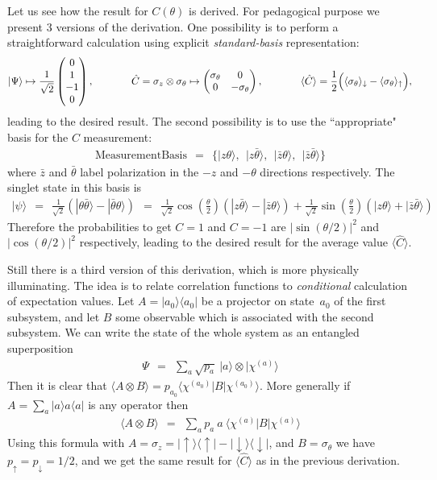 \documentclass[onecolumn,fleqn]{revtex4}
\newcommand{\amatrix}[1]{\begin{matrix} #1 \end{matrix}}
\newcommand{\beq}{\begin{eqnarray}}
\newcommand{\eeq}{\end{eqnarray}}
\begin{document}
Let us see how the result for ${C(\theta)}$ is derived. 
For pedagogical purpose we present 3 versions of the 
derivation. One possibility  is to perform a straightforward 
calculation using explicit {\em standard-basis} representation:        
\beq
|\Psi\rangle  \mapsto \frac{1}{\sqrt{2}}\left(\amatrix{0 \cr 1 \cr -1 \cr 0}\right),
\ \ \ \ \ \ \ \ \ \ \     
\hat{C} = \sigma_z \otimes \sigma_{\theta} 
\mapsto \left(\amatrix{ \sigma_{\theta} & 0 \cr 0 & -\sigma_{\theta} }\right),
\ \ \ \ \ \ \ \ \ \ \  
\langle \hat{C}\rangle = \frac{1}{2}\Big(\langle\sigma_{\theta}\rangle_{\downarrow}-\langle\sigma_{\theta}\rangle_{\uparrow}\Big), 
\eeq
leading to the desired result. The second possibility
is to use the ``appropriate" basis for the $C$ measurement:
\beq
\text{MeasurementBasis} \ \ = \ \ 
\Big\{ 
|z \theta\rangle, \ \ 
|z \bar{\theta}\rangle, \ \ 
|\bar{z} \theta\rangle, \ \ 
|\bar{z} \bar{\theta}\rangle
\Big\} 
\eeq
where $\bar{z}$ and $\bar{\theta}$ label polarization 
in the $-z$ and $-\theta$ directions respectively.
The singlet state in this basis is 
\beq 
|\psi \rangle 
\ \ = \ \ \frac{1}{\sqrt{2}} \left( |\theta\bar{\theta}\rangle-|\bar{\theta}\theta\rangle \right) 
\ \ = \ \ 
\frac{1}{\sqrt{2}}\cos\left(\frac{\theta}{2}\right) \left( |z \bar{\theta}\rangle - |\bar{z}\theta\rangle \right) 
+\frac{1}{\sqrt{2}}\sin\left(\frac{\theta}{2}\right) \left( |z \theta\rangle + |\bar{z}\bar{\theta}\rangle \right)
\eeq
Therefore the probabilities to get $C{=}1$ and $C{=}-1$ 
are $|\sin(\theta/2)|^2$ and $|\cos(\theta/2)|^2$ respectively, 
leading to the desired result for the average value $\langle \hat{C}\rangle$.

Still there is a third version of this derivation, which is more physically 
illuminating. The idea is to relate correlation functions to {\em conditional} calculation 
of expectation values. Let ${A=|a_0\rangle\langle a_0|}$ be a projector 
on state~$a_0$ of the first subsystem, and let $B$ some 
observable which is associated with the second subsystem. 
We can write the state of the whole system as an entangled superposition
\beq
\Psi \ \ = \ \ \sum_a \sqrt{p_a}\ |a \rangle \otimes |\chi^{(a)}\rangle
\eeq
Then it is clear that ${\langle A\otimes B \rangle = p_{a_0} \langle \chi^{(a_0)} |B| \chi^{(a_0)} \rangle}$. 
More generally if ${A=\sum_a |a\rangle a \langle a|}$ is any operator then 
\beq
\langle A\otimes B \rangle \ \ = \ \ \sum_a p_{a} \ a \ \langle \chi^{(a)} |B| \chi^{(a)} \rangle
\eeq
Using this formula 
with $A=\sigma_z=|\uparrow\rangle\langle \uparrow|-|\downarrow\rangle\langle \downarrow|$,  
and $B=\sigma_{\theta}$ we have ${p_{\uparrow}=p_{\downarrow}=1/2}$, 
and we get the same result for $\langle \hat{C}\rangle$ as in the previous derivation.  
 
\end{document}
